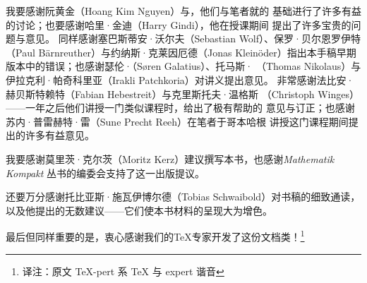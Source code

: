 我要感谢阮黄金（Hoang Kim Nguyen）与\trCisinski{}，他们与笔者就\trHigherCategoryTheory{}的
基础进行了许多有益的讨论；也要感谢哈里·金迪（Harry Gindi），他在授课期间
提出了许多宝贵的问题与意见。
同样感谢塞巴斯蒂安·沃尔夫（Sebastian Wolf）、保罗·贝尔恩罗伊特
（Paul Bärnreuther）与约纳斯·克莱因厄德（Jonas Kleinöder）指出本手稿早期
版本中的错误；也感谢瑟伦·\trGalatius{}（Søren Galatius）、托马斯·\trNikolaus{}%
（Thomas Nikolaus）与伊拉克利·帕奇科里亚（Irakli Patchkoria）对讲义提出意见。
非常感谢法比安·赫贝斯特赖特（Fabian Hebestreit）与克里斯托夫·温格斯
（Christoph Winges）——一年之后他们讲授一门类似课程时，给出了极有帮助的
意见与订正；也感谢苏内·普雷赫特·雷（Sune Precht Reeh）在笔者于哥本哈根
讲授这门课程期间提出的许多有益意见。

我要感谢莫里茨·克尔茨（Moritz Kerz）建议撰写本书，也感谢\emph{Mathematik Kompakt}
丛书的编委会支持了这一出版提议。

还要万分感谢托比亚斯·施瓦伊博尔德（Tobias Schwaibold）对书稿的细致通读，
以及他提出的无数建议——它们使本书材料的呈现大为增色。

最后但同样重要的是，衷心感谢我们的\TeX{}专家开发了这份文档类！\footnote{译注：原文 \TeX-pert 系 TeX 与 expert 谐音}

